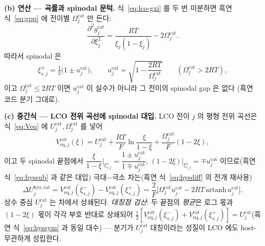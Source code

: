 \documentclass[11pt,a4paper]{article}
\newcommand{\eq}{\mathrm{eq}}
\newcommand{\hys}{\mathrm{hys}}
\begin{document}
\textbf{(b) 연산 — 곡률과 spinodal 문턱.}
식~\eqref{eq:lco-gxi} 를 두 번 미분하면 흑연 식~\eqref{eq:gpp} 에 전이별 $\Omega_j^\mathrm{cat}$ 만 든다:
\begin{equation}
\frac{\partial^2 g_j^\mathrm{cat}}{\partial\xi_j^2}=\frac{RT}{\xi_j(1-\xi_j)}-2\Omega_j^\mathrm{cat}.
\label{eq:lco-gpp}
\end{equation}
따라서 spinodal 은
\begin{equation}
\xi_{s,j}^{\pm}=\tfrac12\big(1\pm u_j^\mathrm{cat}\big),\qquad
u_j^\mathrm{cat}=\sqrt{1-\frac{2RT}{\Omega_j^\mathrm{cat}}}\qquad(\Omega_j^\mathrm{cat}>2RT),
\label{eq:lco-spinodal}
\end{equation}
이고 $\Omega_j^\mathrm{cat}\le2RT$ 이면 $u_j^\mathrm{cat}$ 이 실수가 아니라 그 전이의 spinodal gap 은 없다
(흑연 코드 분기 그대로).

\textbf{(c) 중간식 — LCO 전위 곡선에 spinodal 대입.}
LCO 전이 $j$ 의 평형 전위 곡선은 식~\eqref{eq:Veq} 에 $U_j^\mathrm{cat},\Omega_j^\mathrm{cat}$ 를 넣어
\begin{equation}
V_{\eq,j}^\mathrm{cat}(\xi)=U_j^\mathrm{cat}
+\frac{RT}{F}\ln\frac{\xi}{1-\xi}+\frac{\Omega_j^\mathrm{cat}}{F}(1-2\xi),
\label{eq:lco-Veq}
\end{equation}
이고 두 spinodal 끝점에서 $\dfrac{\xi}{1-\xi}\Big|_{\xi_{s,j}^\pm}=\dfrac{1\pm u_j^\mathrm{cat}}{1\mp
u_j^\mathrm{cat}}$, $(1-2\xi)\big|_{\xi_{s,j}^\pm}=\mp u_j^\mathrm{cat}$ 이므로(흑연 식~\eqref{eq:hyssub}
과 같은 대입) 극대$-$극소 차는(흑연 식~\eqref{eq:hysdiff} 의 전개 재사용)
\[
\Delta U_{j}^{\hys,\mathrm{cat}}=V_{\eq,j}^\mathrm{cat}(\xi_{s,j}^-)-V_{\eq,j}^\mathrm{cat}(\xi_{s,j}^+)
=\frac{2}{F}\big[\Omega_j^\mathrm{cat}u_j^\mathrm{cat}-2RT\,\mathrm{artanh}\,u_j^\mathrm{cat}\big].
\]
상수 중심 $U_j^\mathrm{cat}$ 는 차에서 상쇄된다. \emph{대칭점 검산}: 두 끝점의 \emph{평균}은 로그 몫과
$(1-2\xi)$ 몫이 각각 부호 반대로 상쇄되어 $\tfrac12[V_{\eq,j}^\mathrm{cat}(\xi_{s,j}^-)
+V_{\eq,j}^\mathrm{cat}(\xi_{s,j}^+)]=U_j^\mathrm{cat}$(흑연 식~\eqref{eq:hyssym} 과 동일 대수) —
분기가 $U_j^\mathrm{cat}$ 대칭이라는 성질이 LCO 에도 host-무관하게 성립한다.
\end{document}
